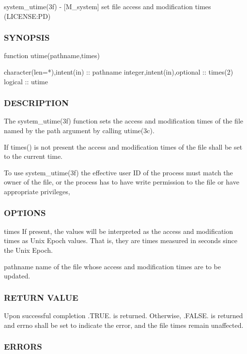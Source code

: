 system\+\_\+utime(3f) -\/ \mbox{[}M\+\_\+system\mbox{]} set file access and modification times (L\+I\+C\+E\+N\+SE\+:PD) 

\subsubsection*{S\+Y\+N\+O\+P\+S\+IS}

\begin{DoxyVerb}    function utime(pathname,times)

     character(len=*),intent(in) :: pathname
     integer,intent(in),optional :: times(2)
     logical                     :: utime
\end{DoxyVerb}


\subsubsection*{D\+E\+S\+C\+R\+I\+P\+T\+I\+ON}

The system\+\_\+utime(3f) function sets the access and modification times of the file named by the path argument by calling utime(3c).

If times() is not present the access and modification times of the file shall be set to the current time.

To use system\+\_\+utime(3f) the effective user ID of the process must match the owner of the file, or the process has to have write permission to the file or have appropriate privileges,

\subsubsection*{O\+P\+T\+I\+O\+NS}

times If present, the values will be interpreted as the access and modification times as Unix Epoch values. That is, they are times measured in seconds since the Unix Epoch.

pathname name of the file whose access and modification times are to be updated.

\subsubsection*{R\+E\+T\+U\+RN V\+A\+L\+UE}

Upon successful completion .T\+R\+UE. is returned. Otherwise, .F\+A\+L\+SE. is returned and errno shall be set to indicate the error, and the file times remain unaffected.

\subsubsection*{E\+R\+R\+O\+RS}

